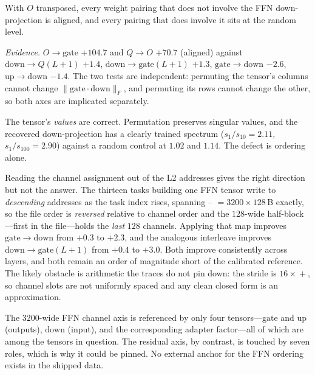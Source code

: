 \begin{finding}\label{find:downonly}
With $O$ transposed, every weight pairing that does not involve the FFN down-projection is aligned,
and every pairing that does involve it sits at the random level.
\end{finding}
\noindent\emph{Evidence.} $O\!\to\!\mathrm{gate}$ $+104.7$ and $Q\!\to\!O$ $+70.7$ (aligned) against
$\mathrm{down}\!\to\!Q(L{+}1)$ $+1.4$, $\mathrm{down}\!\to\!\mathrm{gate}(L{+}1)$ $+1.3$,
$\mathrm{gate}\!\to\!\mathrm{down}$ $-2.6$, $\mathrm{up}\!\to\!\mathrm{down}$ $-1.4$. The two tests
are independent: permuting the tensor's columns cannot change $\lVert\mathrm{gate}\cdot
\mathrm{down}\rVert_F$, and permuting its rows cannot change the other, so both axes are implicated
separately.

The tensor's \emph{values} are correct. Permutation preserves singular values, and the recovered
down-projection has a clearly trained spectrum ($s_1/s_{10}=2.11$, $s_1/s_{100}=2.90$) against a
random control at $1.02$ and $1.14$. The defect is ordering alone.

Reading the channel assignment out of the L2 addresses gives the right direction but not the answer.
The thirteen tasks building one FFN tensor write to \emph{descending} addresses as the task index
rises, spanning -- $=3200\times128$\,B exactly, so the file order is
\emph{reversed} relative to channel order and the $128$-wide half-block---first in the file---holds
the \emph{last} $128$ channels. Applying that map improves
$\mathrm{gate}\!\to\!\mathrm{down}$ from $+0.3$ to $+2.3$, and the analogous interleave improves
$\mathrm{down}\!\to\!\mathrm{gate}(L{+}1)$ from $+0.4$ to $+3.0$. Both improve consistently across
layers, and both remain an order of magnitude short of the calibrated reference. The likely obstacle
is arithmetic the traces do not pin down: the stride  is $16\times$${}+{}$,
so channel slots are not uniformly spaced and any clean closed form is an approximation.

\begin{observation}\label{obs:underdet}
The $3200$-wide FFN channel axis is referenced by only four tensors---$\mathrm{gate}$ and
$\mathrm{up}$ (outputs), $\mathrm{down}$ (input), and the corresponding adapter factor---all of which
are among the tensors in question. The residual axis, by contrast, is touched by seven roles, which
is why it could be pinned. No external anchor for the FFN ordering exists in the shipped data.
\end{observation}

